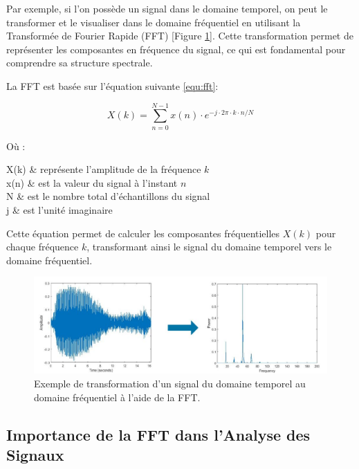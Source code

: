 Par exemple, si l'on possède un signal dans le domaine temporel, on peut le
transformer et le visualiser dans le domaine fréquentiel en utilisant la
Transformée de Fourier Rapide (FFT) [Figure \ref{fig:fft}]. Cette
transformation permet de représenter les composantes en fréquence du signal, ce
qui est fondamental pour comprendre sa structure spectrale.

La FFT est basée sur l'équation suivante \ref{equ:fft}:

\begin{equation}
	X(k) = \sum_{n=0}^{N-1} x(n) \cdot e^{-j \cdot 2\pi \cdot k \cdot n / N}
	\label{equ:fft}
\end{equation}

Où :
\begin{conditions}
	X(k) & représente l'amplitude de la fréquence \( k \) \\
	x(n) & est la valeur du signal à l'instant \( n \) \\
	N & est le nombre total d'échantillons du signal \\
	j & est l'unité imaginaire
\end{conditions}

Cette équation permet de calculer les composantes fréquentielles $X(k)$ pour
chaque fréquence $k$, transformant ainsi le signal du domaine temporel vers le
domaine fréquentiel.

\begin{figure}[hbt!]
	\centering
	\includegraphics[width=14cm]{images_pfe/fft.jpg}
	\caption{
		Exemple de transformation d'un signal du domaine temporel au domaine fréquentiel à l'aide de la FFT.}
	\label{fig:fft}
\end{figure}
\FloatBarrier

\subsection*{Importance de la FFT dans l'Analyse des Signaux}

